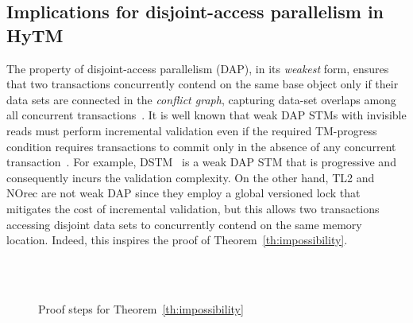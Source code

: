 \subsection{Implications for disjoint-access parallelism in HyTM}
The property of disjoint-access parallelism (DAP), in its \emph{weakest} form, ensures that two transactions %
concurrently contend on the same base object 
only if their data 
sets are connected in the \emph{conflict graph}, capturing 
data-set overlaps among all concurrent transactions~\cite{AHM09}. It is well known that weak DAP STMs with invisible reads must perform incremental validation even if the required TM-progress condition requires
transactions to commit only in the absence of any concurrent transaction~\cite{tm-book,prog15-pact}. For example, DSTM~\cite{HLM+03} is a weak DAP STM that is progressive and consequently incurs the validation
complexity. On the other hand, TL2 and NOrec are not weak DAP since they employ a global versioned lock that mitigates the cost of incremental validation, but this allows two transactions accessing
disjoint data sets to concurrently contend on the same memory location. Indeed, this inspires the proof of Theorem~\ref{th:impossibility}. 
 \begin{figure*}[!t]
 \begin{center}
         \\
         \vspace{1mm}
 	\\
 	\vspace{1mm}
 	\caption{Proof steps for Theorem~\ref{th:impossibility}
         \label{fig:indis}} 
 \end{center}
 \end{figure*}
